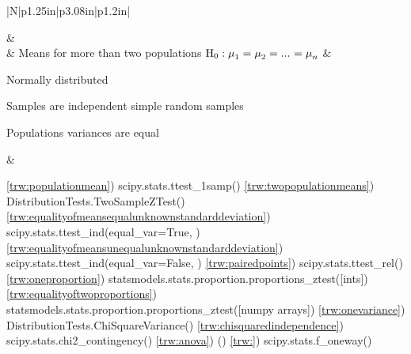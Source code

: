 \begin{longtable}{|N|p{1.25in}|p{3.08in}|p{1.2in}|}
\begin{nospacebulletedlist}
				\end{nospacebulletedlist} &
				 \\ \hline
			\label{trw:anova} &
				Means for more than two populations \newline$\mbox{$\textrm{H}_0$} : \mbox{$\mu$}_1 = \mbox{$\mu$}_2 = ...\hspace*{0.5pt} = \mbox{$\mu$}_n$ \vspace*{1pt} &
				\begin{nospacebulletedlist}
					\item Normally distributed
					\item Samples are independent simple random samples
					\item Populations variances are equal
				\end{nospacebulletedlist} &
				 \\ \hline
        \end{longtable}



	\begin{code}{}
		\codeitem \ref{trw:populationmean}) scipy.stats.ttest\_1samp(\arguments)
		\codeitem \ref{trw:twopopulationmeans}) DistributionTests.TwoSampleZTest(\arguments)
		\codeitem \ref{trw:equalityofmeansequalunknownstandarddeviation}) scipy.stats.ttest\_ind(equal\_var=True, \arguments)
		\codeitem \ref{trw:equalityofmeansunequalunknownstandarddeviation}) scipy.stats.ttest\_ind(equal\_var=False, \arguments)
		\codeitem \ref{trw:pairedpoints}) scipy.stats.ttest\_rel(\arguments)
		\codeitem \ref{trw:oneproportion}) statsmodels.stats.proportion.proportions\_ztest([ints])
		\codeitem \ref{trw:equalityoftwoproportions}) statsmodels.stats.proportion.proportions\_ztest([numpy arrays])
		\codeitem \ref{trw:onevariance}) DistributionTests.ChiSquareVariance(\arguments)
		\codeitem \ref{trw:chisquaredindependence}) scipy.stats.chi2\_contingency(\arguments)
		\codeitem \ref{trw:anova}) (\arguments)
		\codeitem \ref{trw:}) scipy.stats.f\_oneway(\arguments)
	\end{code} 